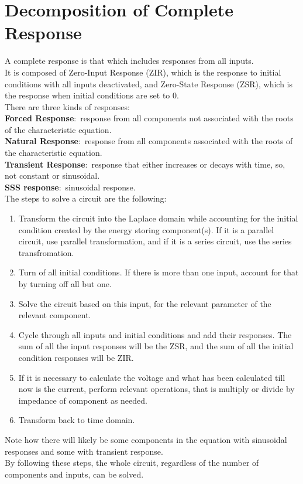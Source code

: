 \documentclass[nobib]{tufte-handout}
\newcommand{\defn}[2]{\noindent\textbf{#1}:\ #2}
\begin{document}
\section{Decomposition of Complete Response}
A complete response is that which includes responses from all inputs.\\
It is composed of Zero-Input Response (ZIR), which is the response to initial conditions with all inputs deactivated, and Zero-State Response (ZSR), which is the response when initial conditions are set to 0.\\
There are three kinds of responses:\\
\defn{Forced Response}{response from all components not associated with the roots of the characteristic equation.}\\
\defn{Natural Response}{response from all components associated with the roots of the characteristic equation.}\\
\defn{Transient Response}{response that either increases or decays with time, so, not constant or sinusoidal.}\\
\defn{SSS response}{sinusoidal response.}\\

The steps to solve a circuit are the following:\\
\begin{enumerate}
    \item Transform the circuit into the Laplace domain while accounting for the initial condition created by the energy storing component(s). If it is a parallel circuit, use parallel transformation, and if it is a series circuit, use the series transfromation.
    \item Turn of all initial conditions. If there is more than one input, account for that by turning off all but one.
    \item Solve the circuit based on this input, for the relevant parameter of the relevant component.
    \item Cycle through all inputs and initial conditions and add their responses. The sum of all the input responses will be the ZSR, and the sum of all the initial condition responses will be ZIR.
    \item If it is necessary to calculate the voltage and what has been calculated till now is the current, perform relevant operations, that is multiply or divide by impedance of component as needed.
    \item Transform back to time domain.
\end{enumerate}
Note how there will likely be some components in the equation with sinusoidal responses and some with transient response.\\
By following these steps, the whole circuit, regardless of the number of components and inputs, can be solved.
\end{document}
